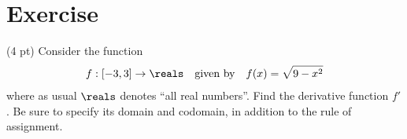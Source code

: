 %
%
%
%

\section{Exercise}


(4 pt) Consider the function
\begin{align*}
f : [-3,3] \rightarrow \reals
&&
\text{given by}
&&
f(x)
=
\sqrt{9 - x^{2}}
\end{align*}
where as usual $\reals$ denotes ``all real numbers''. Find the derivative function $f'$. Be sure to specify its domain and codomain, in addition to the rule of assignment.

\spaceSolution{5in}{%
}%